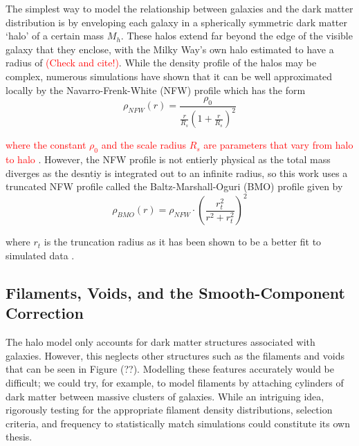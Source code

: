 \documentclass[%
 reprint,
 amsmath,amssymb,
 aps,nofootinbib
]{revtex4-1}
\begin{document}
The simplest way to model the relationship between galaxies and the dark matter distribution is by enveloping each galaxy in a spherically symmetric dark matter `halo' of a certain mass $M_h$. These halos extend far beyond the edge of the visible galaxy that they enclose, with the Milky Way's own halo estimated to have a radius of \textcolor{red}{(Check and cite!)}. While the density profile of the halos may be complex, numerous simulations have shown that it can be well approximated locally by the Navarro-Frenk-White (NFW) profile which has the form
\begin{equation}\label{nfw_profile}
\rho_{NFW}(r)=\frac{\rho_0}{\frac{r}{R_s}\left(1+\frac{r}{R_s}\right)^2}
\end{equation}

\noindent \textcolor{red}{where the constant $\rho_0$ and the scale radius $R_s$ are parameters that vary from halo to halo} \cite{nfw}. However, the NFW profile is not entierly physical as the total mass diverges as the desntiy is integrated out to an infinite radius, so this work uses a truncated NFW profile called the Baltz-Marshall-Oguri (BMO) profile given by
\begin{equation}\label{bmo_profile}
\rho_{BMO}(r)=\rho_{NFW}\cdot\left(\frac{r_t^2}{r^2+r_t^2}\right)^2
\end{equation}

\noindent where $r_t$ is the truncation radius as it has been shown to be a better fit to simulated data \cite{nfw_bmo}.


\subsection{Filaments, Voids, and the Smooth-Component Correction} \label{scc}

The halo model only accounts for dark matter structures associated with galaxies. However, this neglects other structures such as the filaments and voids that can be seen in Figure (??). Modelling these features accurately would be difficult; we could try, for example, to model filaments by attaching cylinders of dark matter between massive clusters of galaxies. While an intriguing idea, rigorously testing for the appropriate filament density distributions, selection criteria, and frequency to statistically match simulations could constitute its own thesis.

\end{document}
